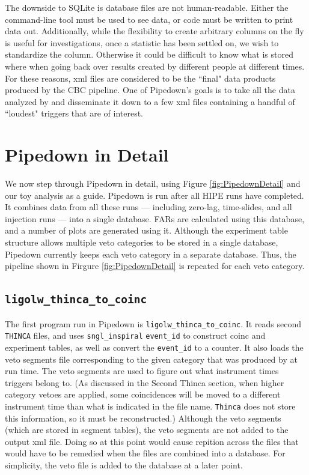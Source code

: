 The downside to SQLite is database files are not human-readable. Either the command-line tool must be used to see data, or code must be written to print data out. Additionally, while the flexibility to create arbitrary columns on the fly is useful for investigations, once a statistic has been settled on, we wish to standardize the column. Otherwise it could be difficult to know what is stored where when going back over results created by different people at different times. For these reasons, xml files are considered to be the ``final" data products produced by the \ac{CBC} pipeline. One of Pipedown's goals is to take all the data analyzed by \ihope and disseminate it down to a few xml files containing a handful of ``loudest" triggers that are of interest.

\section{Pipedown in Detail}

We now step through Pipedown in detail, using Figure \ref{fig:PipedownDetail} and our toy analysis as a guide. Pipedown is run after all \ac{HIPE} runs have completed. It combines data from all these runs --- including zero-lag, time-slides, and all injection runs --- into a single database. \acp{FAR} are calculated using this database, and a number of plots are generated using it. Although the experiment table structure allows multiple veto categories to be stored in a single database, Pipedown currently keeps each veto category in a separate database. Thus, the pipeline shown in Firgure \ref{fig:PipedownDetail} is repeated for each veto category.

\subsection{\texttt{ligolw\_thinca\_to\_coinc}}

The first program run in Pipedown is \texttt{ligolw\_thinca\_to\_coinc}. It reads second \texttt{THINCA} files, and uses \texttt{sngl\_inspiral} \texttt{event\_id} to construct coinc and experiment tables, as well as convert the \texttt{event\_id} to a counter. It also loads the veto segments file corresponding to the given category that was produced by \ihope at run time. The veto segments are used to figure out what instrument times triggers belong to. (As discussed in the Second Thinca section, when higher category vetoes are applied, some coincidences will be moved to a different instrument time than what is indicated in the file name. \texttt{Thinca} does not store this information, so it must be reconstructed.) Although the veto segments (which are stored in segment tables), the veto segments are not added to the output xml file. Doing so at this point would cause repition across the files that would have to be remedied when the files are combined into a database. For simplicity, the veto file is added to the database at a later point.

